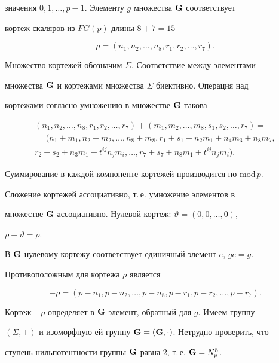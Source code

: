 \begin{pf}
значения $0,1,\dotsc,p-1$. Элементу $g$ множества $\bold G$ соответствует 


кортеж скаляров из $FG(p)$ длины $8+7=15$


$$


\rho=(n_1,n_2,\dotsc,n_8,r_1,r_2,\dotsc,r_7).


$$


Множество кортежей обозначим $\Sigma$. Соответствие между элементами


множества $\bold G$ и кортежами множества $\Sigma$ биективно. Операция над


кортежами согласно умножению в множестве $\bold G$ такова


\begin{multline*}


(n_1,n_2,\dotsc,n_8,r_1,r_2,\dotsc,r_7)+


(m_1,m_2,\dotsc,m_8,s_1,s_2,\dotsc,r_7)=\\


=(n_1+m_1,n_2+m_2,\dotsc,n_8+m_8, r_1+s_1+n_2m_1+n_4m_3+n_8m_7,\\


r_2+s_2+n_3m_1+t^{ij}n_j m_i,\dotsc, r_7+s_7+n_8m_1+


t^{ij}n_j m_i).


\end{multline*}


Суммирование в каждой компоненте кортежей производится по $\mathrm{mod}\,p$.


Сложение кортежей ассоциативно, т.\,е. умножение элементов в


множестве $\bold G$ ассоциативно. Нулевой кортеж: $\vartheta=(0,0,\dotsc,0)$,


$\rho+\vartheta=\rho$.


В $\bold G$ нулевому кортежу соответствует единичный элемент $e$, $ge=g$.


Противоположным для кортежа $\rho$ является


$$


-\rho=(p-n_1,p-n_2,\dotsc,p-n_8,p-r_1,p-r_2,\dotsc,p-r_7).


$$


Кортеж $-\rho$ определяет в $\bold G$ элемент, обратный для $g$. Имеем группу


$(\Sigma,+)$ и изоморфную ей группу $\bold G=(\bold G,\cdot)$. Нетрудно проверить, что


ступень нильпотентности группы $\bold G$ равна 2, т.\,е. $\bold G=N^8_p$.


\end{pf}





